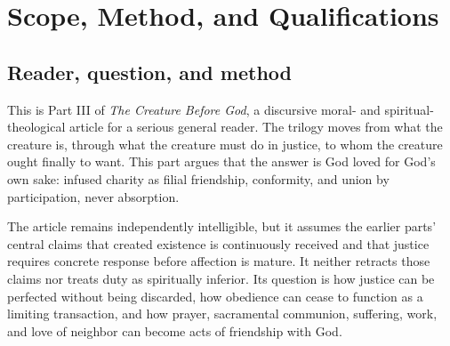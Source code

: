 \section{Scope, Method, and Qualifications}

\subsection{Reader, question, and method}

This is Part III of \emph{The Creature Before God}, a discursive moral- and spiritual-theological article for a serious general reader. The trilogy moves from what the creature is, through what the creature must do in justice, to whom the creature ought finally to want. This part argues that the answer is God loved for God's own sake: infused charity as filial friendship, conformity, and union by participation, never absorption.

The article remains independently intelligible, but it assumes the earlier parts' central claims that created existence is continuously received and that justice requires concrete response before affection is mature. It neither retracts those claims nor treats duty as spiritually inferior. Its question is how justice can be perfected without being discarded, how obedience can cease to function as a limiting transaction, and how prayer, sacramental communion, suffering, work, and love of neighbor can become acts of friendship with God.

